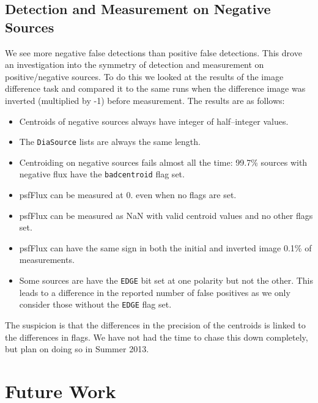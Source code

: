 \documentclass[prd, nofootinbib, floatfix, 11pt,tightenlines,times]{article}
\begin{document}
\subsection{Detection and Measurement on Negative Sources}
We see more negative false detections than positive false detections.  This drove an investigation 
into the symmetry of detection and measurement on positive/negative sources.  To do this we looked at the 
results of the image difference task and compared it to the same runs when the difference image was inverted
(multiplied by -1) before measurement.  The results are as follows:
\begin{itemize}
\item Centroids of negative sources always have integer of half--integer values.
\item The {\tt DiaSource} lists are always the same length.
\item Centroiding on negative sources fails almost all the time: 99.7\% sources with negative flux
have the {\tt badcentroid} flag set.
\item psfFlux can be measured at 0. even when no flags are set.
\item psfFlux can be measured as NaN with valid centroid values and no other flags set.
\item psfFlux can have the same sign in both the initial and inverted image 0.1\% of measurements.
\item Some sources are have the {\tt EDGE} bit set at one polarity but not the other.  
  This leads to a difference in the reported number of false positives as we only consider 
  those without the {\tt EDGE} flag set.
\end{itemize}

The suspicion is that the differences in the precision of the centroids is linked to the differences in flags.
We have not had the time to chase this down completely, but plan on doing so in Summer 2013.


\section{Future Work}
\end{document}

